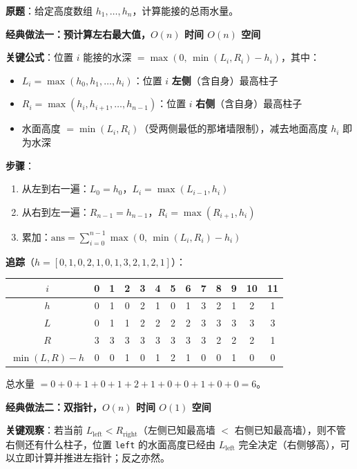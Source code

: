 \documentclass[12pt, a4paper]{ctexart}
\begin{document}
\begin{blackboard}

\textbf{原题}：给定高度数组 $h_1, \ldots, h_n$，计算能接的总雨水量。

\textbf{经典做法一：预计算左右最大值，$O(n)$ 时间 $O(n)$ 空间}

\textbf{关键公式}：位置 $i$ 能接的水深 $= \max(0,\, \min(L_i, R_i) - h_i)$，其中：
\begin{itemize}
    \item $L_i = \max(h_0, h_1, \ldots, h_i)$：位置 $i$ \textbf{左侧}（含自身）最高柱子
    \item $R_i = \max(h_i, h_{i+1}, \ldots, h_{n-1})$：位置 $i$ \textbf{右侧}（含自身）最高柱子
    \item 水面高度 $= \min(L_i, R_i)$（受两侧最低的那堵墙限制），减去地面高度 $h_i$ 即为水深
\end{itemize}

\textbf{步骤}：
\begin{enumerate}
    \item 从左到右一遍：$L_0 = h_0$，$L_i = \max(L_{i-1}, h_i)$
    \item 从右到左一遍：$R_{n-1} = h_{n-1}$，$R_i = \max(R_{i+1}, h_i)$
    \item 累加：$\text{ans} = \sum_{i=0}^{n-1} \max(0,\, \min(L_i, R_i) - h_i)$
\end{enumerate}

\textbf{追踪}（$h=[0,1,0,2,1,0,1,3,2,1,2,1]$）：

\medskip
\begin{center}\small
\begin{tabular}{c|cccccccccccc}
$i$ & 0&1&2&3&4&5&6&7&8&9&10&11 \\
\hline
$h$ & 0&1&0&2&1&0&1&3&2&1&2&1 \\
$L$ & 0&1&1&2&2&2&2&3&3&3&3&3 \\
$R$ & 3&3&3&3&3&3&3&3&2&2&2&1 \\
$\min(L,R)-h$ & 0&0&1&0&1&2&1&0&0&1&0&0 \\
\end{tabular}
\end{center}

\medskip
总水量 $= 0+0+1+0+1+2+1+0+0+1+0+0 = 6$。

\textbf{经典做法二：双指针，$O(n)$ 时间 $O(1)$ 空间}

\textbf{关键观察}：若当前 $L_{\text{left}} < R_{\text{right}}$（左侧已知最高墙 $<$ 右侧已知最高墙），则不管右侧还有什么柱子，位置 \texttt{left} 的水面高度已经由 $L_{\text{left}}$ 完全决定（右侧够高），可以立即计算并推进左指针；反之亦然。


\end{blackboard}
\end{document}
